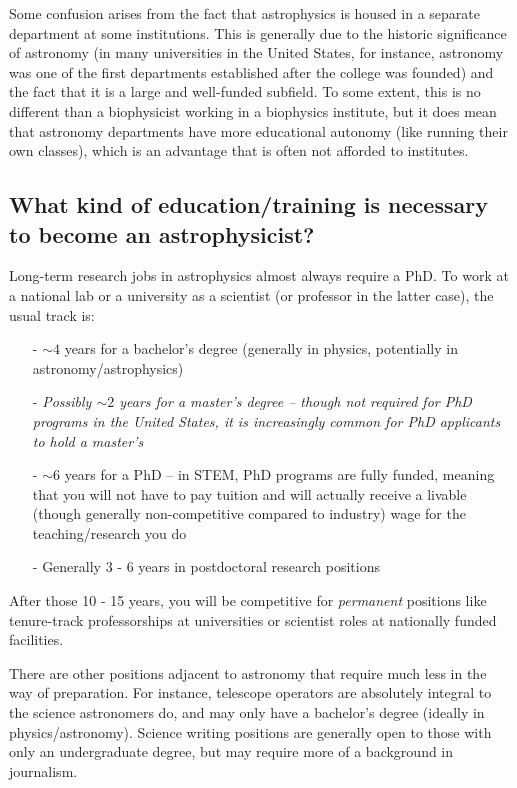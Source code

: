 Some confusion arises from the fact that astrophysics is housed in a separate department at some institutions. This is generally due to the historic significance of astronomy (in many universities in the United States, for instance, astronomy was one of the first departments established after the college was founded) and the fact that it is a large and well-funded subfield. To some extent, this is no different than a biophysicist working in a biophysics institute, but it does mean that astronomy departments have more educational autonomy (like running their own classes), which is an advantage that is often not afforded to institutes.

\pagebreak
\strut
\vspace{-3cm}

\subsection{What kind of education/training is necessary to become an astrophysicist?}

Long-term research jobs in astrophysics almost always require a PhD. To work at a national lab or a university as a scientist (or professor in the latter case), the usual track is:
\begin{itemize}
    \item[-]$\sim4$ years for a bachelor's degree (generally in physics, potentially in astronomy/astrophysics)
    \item[-]\textit{Possibly $\sim2$ years for a master's degree -- though not required for PhD programs in the United States, it is increasingly common for PhD applicants to hold a master's}
    \item[-]$\sim 6$ years for a PhD -- in STEM, PhD programs are fully funded, meaning that you will not have to pay tuition and will actually receive a livable (though generally non-competitive compared to industry) wage for the teaching/research you do  
    \item[-] Generally 3 - 6 years in postdoctoral research positions
\end{itemize} 
After those 10 - 15 years, you will be competitive for \textit{permanent} positions like tenure-track professorships at universities or scientist roles at nationally funded facilities.

There are other positions adjacent to astronomy that require much less in the way of preparation. For instance, telescope operators are absolutely integral to the science astronomers do, and may only have a bachelor's degree (ideally in physics/astronomy). Science writing positions are generally open to those with only an undergraduate degree, but may require more of a background in journalism.

